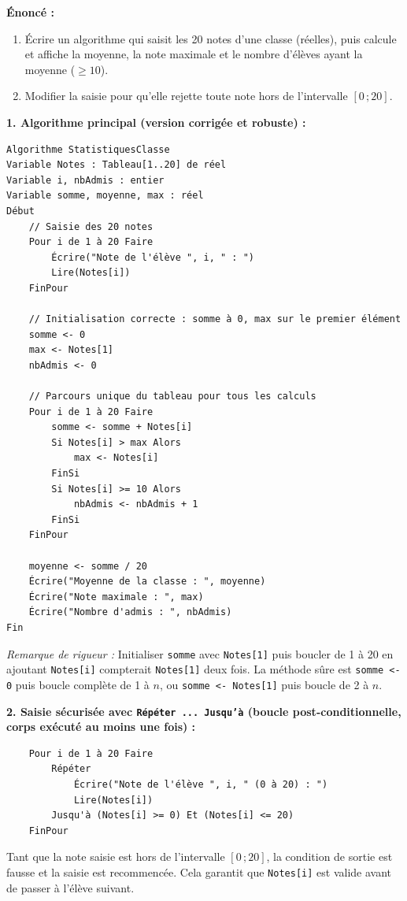 \documentclass[11pt]{article}
\begin{document}
\begin{corrige}
\textbf{Énoncé :}
\begin{enumerate}
  \item Écrire un algorithme qui saisit les 20 notes d'une classe (réelles), puis calcule et affiche la moyenne, la note maximale et le nombre d'élèves ayant la moyenne ($\ge 10$).
  \item Modifier la saisie pour qu'elle rejette toute note hors de l'intervalle $[0\,;20]$.
\end{enumerate}
\tcblower
\textbf{1. Algorithme principal (version corrigée et robuste) :}

\begin{lstlisting}
Algorithme StatistiquesClasse
Variable Notes : Tableau[1..20] de réel
Variable i, nbAdmis : entier
Variable somme, moyenne, max : réel
Début
    // Saisie des 20 notes
    Pour i de 1 à 20 Faire
        Écrire("Note de l'élève ", i, " : ")
        Lire(Notes[i])
    FinPour

    // Initialisation correcte : somme à 0, max sur le premier élément
    somme <- 0
    max <- Notes[1]
    nbAdmis <- 0

    // Parcours unique du tableau pour tous les calculs
    Pour i de 1 à 20 Faire
        somme <- somme + Notes[i]
        Si Notes[i] > max Alors
            max <- Notes[i]
        FinSi
        Si Notes[i] >= 10 Alors
            nbAdmis <- nbAdmis + 1
        FinSi
    FinPour

    moyenne <- somme / 20
    Écrire("Moyenne de la classe : ", moyenne)
    Écrire("Note maximale : ", max)
    Écrire("Nombre d'admis : ", nbAdmis)
Fin
\end{lstlisting}

\emph{Remarque de rigueur :} Initialiser \texttt{somme} avec \texttt{Notes[1]} puis boucler de 1 à 20 en ajoutant \texttt{Notes[i]} compterait \texttt{Notes[1]} deux fois. La méthode sûre est \texttt{somme <- 0} puis boucle complète de 1 à $n$, ou \texttt{somme <- Notes[1]} puis boucle de 2 à $n$.

\textbf{2. Saisie sécurisée avec \texttt{Répéter ... Jusqu'à} (boucle post-conditionnelle, corps exécuté au moins une fois) :}

\begin{lstlisting}
    Pour i de 1 à 20 Faire
        Répéter
            Écrire("Note de l'élève ", i, " (0 à 20) : ")
            Lire(Notes[i])
        Jusqu'à (Notes[i] >= 0) Et (Notes[i] <= 20)
    FinPour
\end{lstlisting}

Tant que la note saisie est hors de l'intervalle $[0\,;20]$, la condition de sortie est fausse et la saisie est recommencée. Cela garantit que \texttt{Notes[i]} est valide avant de passer à l'élève suivant.
\end{corrige}
\end{document}
